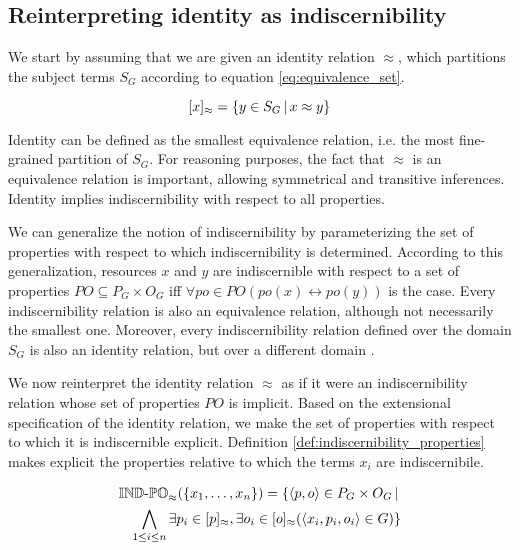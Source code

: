 \subsection{Reinterpreting identity as indiscernibility}

We start by assuming that we are given an identity relation $\approx$,
  which partitions the subject terms $S_G$ according to
  \mbox{equation} \ref{eq:equivalence_set}.

\begin{equation}
\label{eq:equivalence_set}
  [x]_{\approx}
=
  \{
    y \in S_G
  \,\vert\,
    x \approx y
  \}
\end{equation}

\noindent Identity can be defined as the smallest equivalence relation,
  i.e. the most fine-grained partition of $S_G$.
For reasoning purposes, the fact that $\approx$ is an equivalence relation
  is important, allowing symmetrical and transitive inferences.
Identity implies indiscernibility with respect to all properties.

We can generalize the notion of indiscernibility
  by parameterizing the set of properties with respect to which
  indiscernibility is determined.
According to this generalization,
  resources $x$ and $y$ are indiscernible with respect to
  a set of properties $PO \subseteq P_G \times O_G$
  iff $\forall po \in PO (po(x) \leftrightarrow po(y))$ is the case.
Every indiscernibility relation is also an equivalence relation,
  although not necessarily the smallest one.
Moreover, every indiscernibility relation defined over the domain $S_G$
  is also an identity relation, but over a different domain \cite{Quine1950}.

We now reinterpret the identity relation $\approx$
  as if it were an indiscernibility relation
  whose set of properties $PO$ is implicit.
Based on the extensional specification of the identity relation,
  we make the set of properties with respect to which it is indiscernible
  explicit.
Definition \ref{def:indiscernibility_properties} makes explicit
  the properties relative to which the terms $x_i$ are indiscernibile.

\begin{definition}
\label{def:indiscernibility_properties}
\begin{align}
  \operatorname{{\mathbb{IND}-\mathbb{PO}}}_{\approx}(\{x_1,\ldots,x_n\})
=
  \{
    \langle p,o\rangle \in P_G \times O_G
  \,\vert\,\nonumber\\
    \bigwedge_{1 \leq i \leq n}
      \exists p_i \in [p]_{\approx},
        \exists o_i \in [o]_{\approx}(
          \langle x_i,p_i,o_i\rangle \in G
        )
  \}\nonumber
\end{align}
\end{definition}

